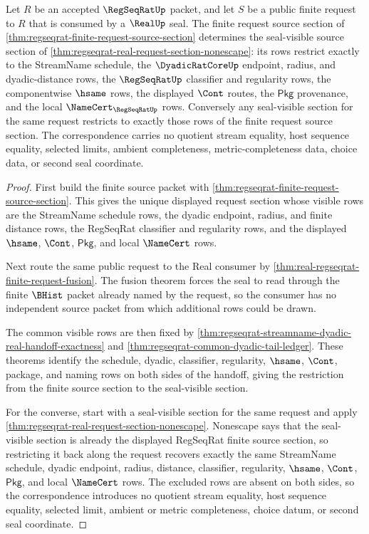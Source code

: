 \begin{theorem}
\label{thm:regseqrat-finite-request-real-seal-correspondence}
Let $R$ be an accepted $\RegSeqRatUp$ packet, and let $S$ be a public finite
request to $R$ that is consumed by a $\RealUp$ seal. The finite request source
section of \autoref{thm:regseqrat-finite-request-source-section} determines
the seal-visible source section of
\autoref{thm:regseqrat-real-request-section-nonescape}: its rows restrict
exactly to the StreamName schedule, the $\DyadicRatCoreUp$ endpoint, radius,
and dyadic-distance rows, the $\RegSeqRatUp$ classifier and regularity rows,
the componentwise $\hsame$ rows, the displayed $\Cont$ routes, the
$\mathsf{Pkg}$ provenance, and the local $\NameCert_{\RegSeqRatUp}$ rows.
Conversely any seal-visible section for the same request restricts to exactly
those rows of the finite request source section. The correspondence carries no
quotient stream equality, host sequence equality, selected limits, ambient
completeness, metric-completeness data, choice data, or second seal coordinate.
\end{theorem}
\begin{proof}
First build the finite source packet with
\autoref{thm:regseqrat-finite-request-source-section}. This gives the unique
displayed request section whose visible rows are the StreamName schedule rows,
the dyadic endpoint, radius, and finite distance rows, the RegSeqRat classifier
and regularity rows, and the displayed $\hsame$, $\Cont$, $\mathsf{Pkg}$, and
local $\NameCert$ rows.

Next route the same public request to the Real consumer by
\autoref{thm:real-regseqrat-finite-request-fusion}. The fusion theorem forces
the seal to read through the finite $\BHist$ packet already named by the
request, so the consumer has no independent source packet from which additional
rows could be drawn.

The common visible rows are then fixed by
\autoref{thm:regseqrat-streamname-dyadic-real-handoff-exactness} and
\autoref{thm:regseqrat-common-dyadic-tail-ledger}. These theorems identify the
schedule, dyadic, classifier, regularity, $\hsame$, $\Cont$, package, and
naming rows on both sides of the handoff, giving the restriction from the
finite source section to the seal-visible section.

For the converse, start with a seal-visible section for the same request and
apply \autoref{thm:regseqrat-real-request-section-nonescape}. Nonescape says
that the seal-visible section is already the displayed RegSeqRat finite source
section, so restricting it back along the request recovers exactly the same
StreamName schedule, dyadic endpoint, radius, distance, classifier,
regularity, $\hsame$, $\Cont$, $\mathsf{Pkg}$, and local $\NameCert$ rows.
The excluded rows are absent on both sides, so the correspondence introduces
no quotient stream equality, host sequence equality, selected limit, ambient or
metric completeness, choice datum, or second seal coordinate.
\end{proof}
